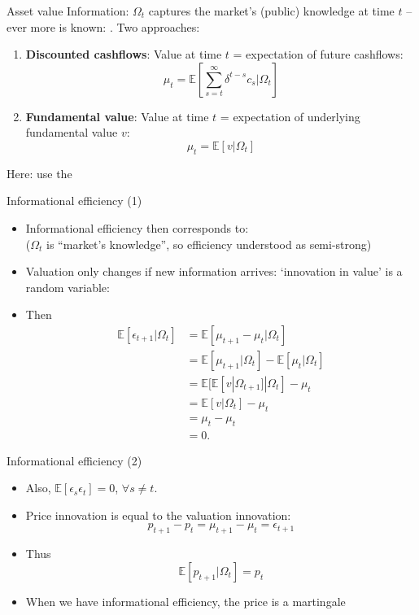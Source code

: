 \begin{frame}{Asset value}
	Information: $\Omega_t$ captures the market's (public) knowledge at time $t$ -- ever more is known: 
	. Two approaches:
	\begin{enumerate}
		\item \textbf{Discounted cashflows}: Value at time $t$  = expectation of future cashflows:
		\[
		\mu_t = \mathbb{E}\left[\sum_{s=t}^{\infty} \delta^{t-s} c_s | \Omega_t \right]
		\]
		\item \textbf{Fundamental value}: Value at time $t$ = expectation of underlying fundamental value $v$:
		\[
		\mu_t = \mathbb{E} \left[ v | \Omega_t \right]
		\]
	\end{enumerate}
	Here: use the 
\end{frame}


\begin{frame}{Informational efficiency (1)}
\begin{itemize}
	\item Informational efficiency then corresponds to: 
	\\
	($\Omega_t$ is ``market's knowledge'', so efficiency understood as semi-strong)
	\item Valuation only changes if new information arrives: `innovation in value' is a random variable: 
	\item Then
	\begin{align*}
		\mathbb{E}[\epsilon_{t+1}|\Omega_t] 
		& = \mathbb{E}[\mu_{t+1} - \mu_t|\Omega_t]\\
		& = \mathbb{E}[\mu_{t+1}|\Omega_t] - \mathbb{E}[\mu_t|\Omega_t]\\  
		& = \mathbb{E}[ \mathbb{E}[v|\Omega_{t+1}]|\Omega_t] - \mu_t\\  
		& = \mathbb{E}[v|\Omega_t] - \mu_t\\  
		& = \mu_t- \mu_t\\  
		& = 0.
	\end{align*}
\end{itemize}
\end{frame}


\begin{frame}{Informational efficiency (2)}
	\begin{itemize}
	 \item Also, $\mathbb{E}[\epsilon_{s}\epsilon_t]=0$, $\forall s \ne t$.
	\item Price innovation is equal to the valuation innovation:
	\[
	p_{t+1} - p_t = \mu_{t+1} - \mu_t = \epsilon_{t+1}
	\]
	\item Thus
	\[
	\mathbb{E}[p_{t+1}|\Omega_{t}] = p_t
	\]
	\item When we have informational efficiency, the price is a \alert{martingale}
\end{itemize}
\end{frame}



